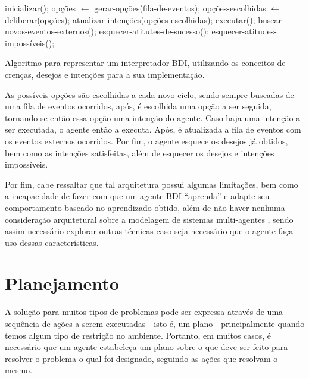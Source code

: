 \begin{algorithm}[htb] \begin{center}
	\begin{algorithmic}[1] \STATE inicializar(); \STATE {} \STATE
	opções $\gets$ gerar-opções(fila-de-eventos); \STATE opções-escolhidas
	$\gets$ deliberar(opções); \STATE atualizar-intenções(opções-escolhidas);
	\STATE executar(); \STATE buscar-novos-eventos-externos(); \STATE
	esquecer-atitutes-de-sucesso(); \STATE esquecer-atitudes-impossíveis();
	\ENDWHILE \end{algorithmic} \end{center} \caption[Algoritmo para representar
	um interpretador BDI.] {\label{alg:BDIINTERPRETERALG} Algoritmo para
	representar um interpretador BDI, utilizando os conceitos de crenças,
	desejos e intenções para a sua implementação.} \end{algorithm}

As possíveis opções são escolhidas a cada novo ciclo, sendo sempre buscadas de
uma fila de eventos ocorridos, após, é escolhida uma opção a ser seguida,
tornando-se então essa opção uma intenção do agente. Caso haja uma intenção a
ser executada, o agente então a executa. Após, é atualizada a fila de eventos
com os eventos externos ocorridos. Por fim, o agente esquece os desejos já
obtidos, bem como as intenções satisfeitas, além de esquecer os desejos e
intenções impossíveis.

Por fim, cabe ressaltar que tal arquitetura possui algumas limitações, bem como
a incapacidade de fazer com que um agente BDI ``aprenda'' e adapte seu
comportamento baseado no aprendizado obtido, além de não haver nenhuma
consideração arquitetural sobre a modelagem de sistemas multi-agentes
\cite{BDIMODELOFAGENCY}, sendo assim necessário explorar outras técnicas caso
seja necessário que o agente faça uso dessas características.

\section{Planejamento}

A solução para muitos tipos de problemas pode ser expressa através de uma
sequência de ações a serem executadas - isto é, um plano - principalmente quando
temos algum tipo de restrição no ambiente. Portanto, em muitos casos, é
necessário que um agente estabeleça um plano sobre o que deve ser feito para
resolver o problema o qual foi designado, seguindo as ações que resolvam o
mesmo.

